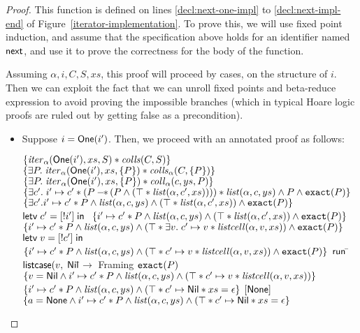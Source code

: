 \begin{proof}
This function is defined on lines \ref{decl:next-one-impl} to \ref{decl:next-impl-end} 
of Figure~\ref{iterator-implementation}. To prove this, we will use fixed point induction,
and assume that the specification above holds for an identifier named $\mathsf{next}$, and
use it to prove the correctness for the body of the function. 

Assuming $\alpha, i, C, S, xs$, this proof will proceed by cases, on
the structure of $i$. Then we can exploit the fact that we can unroll fixed
points and beta-reduce expression to avoid proving the impossible branches (which
in typical Hoare logic proofs are ruled out by getting false as a precondition). 

\begin{itemize}
\item Suppose $i = \mathsf{One}(i')$. Then, we proceed with an annotated proof as 
follows: 
\begin{specification}
\nextline $\{{\mathit{iter}_\alpha(\mathsf{One}(i'), xs, S) * \mathit{colls}(C,S)}\}$ 
\nextline $\{{\exists P.\; \mathit{iter}_\alpha(\mathsf{One}(i'), xs, \{{P}\}) * \mathit{colls}_\alpha(C,\{{P}\})}\}$ 
\nextline $\{{\exists P.\; \mathit{iter}_\alpha(\mathsf{One}(i'), xs, \{{P}\}) * \mathit{coll}_\alpha(c, ys, P)}\}$
\nextline $\{{\exists c'.\; i' \mapsto c' * (P -\!\!*\, (P \land (\top * \mathit{list}(\alpha, c', xs)))) * \mathit{list}(\alpha,c, ys) \land P \land \mathtt{exact}({P})}\}$ 
\nextline $\{{\exists c'. i' \mapsto c' * P \land \mathit{list}(\alpha, c, ys) \land (\top * \mathit{list}(\alpha, c', xs)) \land \mathtt{exact}({P})}\}$ 
\nextline $\mathsf{letv}\;c' = [!i']\;\mathsf{in}\;$ 
\nextline $\{{i' \mapsto c' * P \land \mathit{list}(\alpha, c, ys) \land (\top * \mathit{list}(\alpha, c', xs)) \land \mathtt{exact}({P})}\}$ 
\nextline $\{{i' \mapsto c' * P \land \mathit{list}(\alpha, c, ys) \land (\top * \exists v.\; c' \mapsto v * \mathit{listcell}(\alpha, v, xs)) \land \mathtt{exact}({P})}\}$ 
\nextline $\mathsf{letv}\;v = [!c']\;\mathsf{in}\;$ 
\nextline $\{{i' \mapsto c' * P \land \mathit{list}(\alpha, c, ys) \land (\top * c' \mapsto v * \mathit{listcell}(\alpha, v, xs)) \land \mathtt{exact}({P})}\}$ 
\nextline $\mathsf{run}\;$\=$\mathsf{listcase}(v,$ 
\nextline \> $\mathsf{Nil} $\=$\to$ 
\nextline \> \> Framing $\mathtt{exact}({P})$
\nextline \> \> $\{{v = \mathsf{Nil} \land i' \mapsto c' * P \land \mathit{list}(\alpha, c, ys) \land (\top * c' \mapsto v * \mathit{listcell}(\alpha, v, xs))}\}$ 
\nextline \> \> $\{{i' \mapsto c' * P \land \mathit{list}(\alpha, c, ys) \land (\top * c' \mapsto \mathsf{Nil} * xs = \epsilon}\}$ 
\nextline \> \> $[\mathsf{None}]$ 
\nextline \> \> $\{{a = \mathsf{None} \land i' \mapsto c' * P \land \mathit{list}(\alpha, c, ys) \land (\top * c' \mapsto \mathsf{Nil} * xs = \epsilon}\}$ 

\end{specification}
\end{itemize}
\end{proof}
